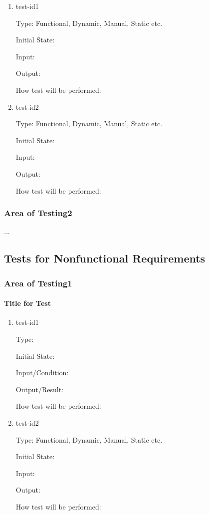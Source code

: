 \documentclass[12pt, titlepage]{article}
\begin{document}
\begin{enumerate}

\item{test-id1\\}

Type: Functional, Dynamic, Manual, Static etc.

Initial State:

Input:

Output:

How test will be performed:

\item{test-id2\\}

Type: Functional, Dynamic, Manual, Static etc.

Initial State:

Input:

Output:

How test will be performed:

\end{enumerate}

\subsubsection{Area of Testing2}

...

\subsection{Tests for Nonfunctional Requirements}

\subsubsection{Area of Testing1}

\paragraph{Title for Test}

\begin{enumerate}

\item{test-id1\\}

Type:

Initial State:

Input/Condition:

Output/Result:

How test will be performed:

\item{test-id2\\}

Type: Functional, Dynamic, Manual, Static etc.

Initial State:

Input:

Output:

How test will be performed:

\end{enumerate}
\end{document}
